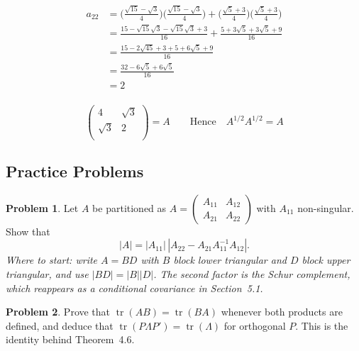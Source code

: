 \documentclass[11pt,a4paper]{article}
\theoremstyle{definition}
\newtheorem{problemx}{Problem}[section]
\newenvironment{problem}{\begin{problemx}}{\end{problemx}}
\begin{document}
\begin{align*}
a_{22} & = \Bigg(\frac{\sqrt{15}-\sqrt{3}}{4}\Bigg)\Bigg(\frac{\sqrt{15}-\sqrt{3}}{4}\Bigg)+\Bigg(\frac{\sqrt{5}+3}{4}\Bigg)\Bigg(\frac{\sqrt{5}+3}{4}\Bigg)\\ & = \frac{15-\sqrt{15}\sqrt{3}-\sqrt{15}\sqrt{3}+3}{16}+\frac{5+3\sqrt{5}+3\sqrt{5}+9}{16}\\
         & = \frac{15-2\sqrt{45}+3+5+6\sqrt{5}+9}{16}\\
         & = \frac{32-6\sqrt{5}+6\sqrt{5}}{16}\\
         & = 2\\ 
\end{align*}


$$
\begin{pmatrix}
4 & \sqrt{3}\\
\sqrt{3} & 2\\
\end{pmatrix}
= A\qquad \text{Hence}\quad  A^{1/2}A^{1/2} = A
$$








\pagebreak

\subsection{Practice Problems}

\begin{problem}
Let $A$ be partitioned as
$A = \begin{pmatrix} A_{11} & A_{12}\\ A_{21} & A_{22}\end{pmatrix}$
with $A_{11}$ non-singular. Show that
$$\left|A\right| = \left|A_{11}\right|\,
\left|A_{22}-A_{21}A_{11}^{-1}A_{12}\right|.$$
\emph{Where to start: write $A = BD$ with $B$ block lower triangular and $D$
block upper triangular, and use $|BD| = |B||D|$. The second factor is the Schur
complement, which reappears as a conditional covariance in Section~5.1.}
\end{problem}

\begin{problem}
Prove that $\operatorname{tr}(AB) = \operatorname{tr}(BA)$ whenever both
products are defined, and deduce that
$\operatorname{tr}(P\Lambda P') = \operatorname{tr}(\Lambda)$ for orthogonal
$P$. This is the identity behind Theorem~4.6.
\end{problem}
\end{document}
